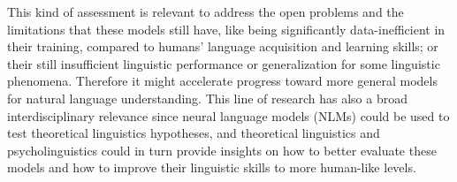 %
%
%
%
This kind of assessment is 
relevant to address the open problems and the limitations that these models still have, like being significantly data-inefficient in their training, compared to humans’ language acquisition and learning skills; or their still insufficient linguistic performance or generalization for some linguistic phenomena. Therefore it might accelerate progress toward more general models for natural language understanding. This line of research has also a broad interdisciplinary relevance since neural language models (NLMs) could be used to test theoretical linguistics hypotheses, and theoretical linguistics and psycholinguistics could in turn provide insights on how to better evaluate these models and how to improve their linguistic skills to more human-like levels.\\ 

